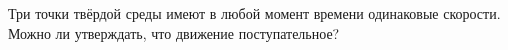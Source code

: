 Три точки твёрдой среды имеют в любой момент времени одинаковые
скорости. Можно ли утверждать, что движение поступательное?
